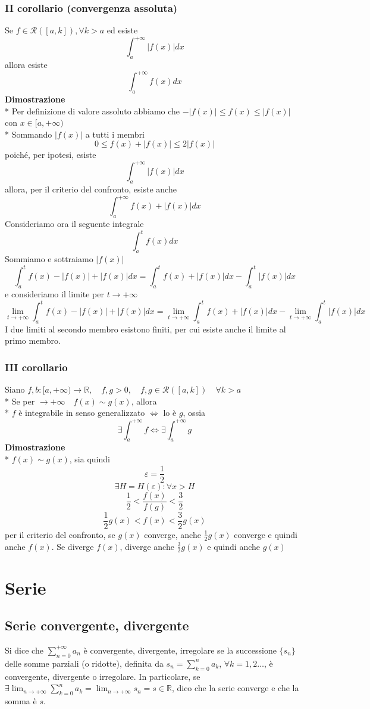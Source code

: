 \documentclass[12pt]{article}
\begin{document}
\subsubsection{II corollario (convergenza assoluta)}
Se $f \in \mathscr{R}([a,k]), \forall k > a$ ed esiste
\[ \int_a^{+\infty}|f(x)|dx \]
allora esiste
\[ \int_a^{+\infty}f(x)dx \]
\textbf{Dimostrazione}\\*
Per definizione di valore assoluto abbiamo che $-|f(x)|\leq f(x) \leq |f(x)|$ con $x\in [a, +\infty)$\\*
Sommando $|f(x)|$ a tutti i membri
\[ 0\leq f(x) + |f(x)| \leq 2|f(x)| \]
poiché, per ipotesi, esiste
\[ \int_{a}^{+\infty} |f(x)| dx\]
 allora, per il criterio del confronto, esiste anche 
\[ \int_{a}^{+\infty} f(x) + |f(x)| dx \]
Consideriamo ora il seguente integrale
\[ \int_{a}^{t} f(x) dx \]
Sommiamo e sottraiamo $|f(x)|$
\[ \int_{a}^{t} f(x) - |f(x)| + |f(x)| dx = \int_{a}^{t} f(x) + |f(x)| dx - \int_{a}^{t} |f(x)| dx\]
e consideriamo il limite per $t \to +\infty$
\[ \lim_{t \to +\infty} \int_{a}^{t} f(x) - |f(x)| + |f(x)| dx = \lim_{t \to +\infty} \int_{a}^{t} f(x) + |f(x)| dx - \lim_{t \to +\infty} \int_{a}^{t} |f(x)| dx\]
I due limiti al secondo membro esistono finiti, per cui esiste anche il limite al primo membro.

\subsubsection{III corollario}
Siano  $f,b : [a, +\infty) \to \mathbb{R}, \quad f,g>0, \quad f,g \in \mathscr{R}([a,k]) \quad \forall k>a$\\*
Se per $\to +\infty \quad f(x) \sim g(x)$, allora\\*
$f$ è integrabile in senso generalizzato $\Leftrightarrow$ lo è $g$, ossia
\[ \exists \int_a^{+\infty} f \Leftrightarrow \exists \int_a^{+\infty} g\]
\textbf{Dimostrazione}\\*
$f(x)\sim g(x)$, sia quindi
\[ \varepsilon = \frac{1}{2}\]
\[ \exists H = H(\varepsilon) : \forall x > H \]
\[ \frac{1}{2} < \frac{f(x)}{f(g)} < \frac{3}{2} \]
\[ \frac{1}{2} g(x) < f(x) < \frac{3}{2} g(x)\]
per il criterio del confronto, se $g(x)$ converge, anche $\frac{1}{2} g(x)$ converge e quindi anche $f(x)$. Se diverge $f(x)$, diverge anche $\frac{3}{2}g(x)$ e quindi anche $g(x)$
\section{Serie}
\subsection{Serie convergente, divergente}
Si dice che $\displaystyle \sum_{n=0}^{+\infty} a_n$ è convergente, divergente, irregolare se la successione $\{ s_n \}$ delle somme parziali (o ridotte), definita da $s_n = \sum_{k=0}^n a_k$, $\forall k = 1, 2 \dots$, è convergente, divergente o irregolare. In particolare, se $\displaystyle \exists \lim_{n \to +\infty} \sum_{k=0}^n a_k = \lim_{n \to +\infty} s_n = s \in \mathbb{R}$, dico che la serie converge e che la somma è $s$.
\end{document}
